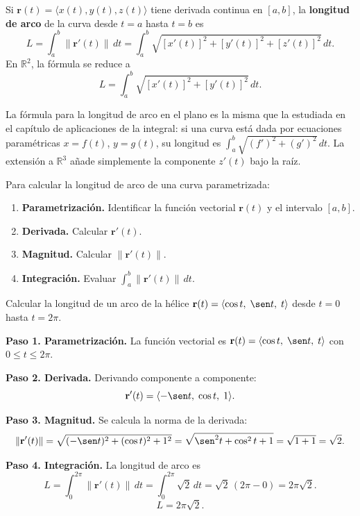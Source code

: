 \begin{theorem}
Si $\mathbf{r}(t) = \langle x(t), y(t), z(t) \rangle$ tiene derivada
continua en $[a,b]$, la \textbf{longitud de arco} de la curva desde
$t=a$ hasta $t=b$ es
\[
L = \int_a^b \|\mathbf{r}'(t)\|\,dt
  = \int_a^b \sqrt{[x'(t)]^2 + [y'(t)]^2 + [z'(t)]^2}\,dt.
\]
En $\mathbb{R}^2$, la fórmula se reduce a
\[
L = \int_a^b \sqrt{[x'(t)]^2 + [y'(t)]^2}\,dt.
\]
\end{theorem}

\begin{rem}
La fórmula para la longitud de arco en el plano es la misma que la
estudiada en el capítulo de aplicaciones de la integral: si una curva
está dada por ecuaciones paramétricas $x = f(t)$, $y = g(t)$, su
longitud es $\int_a^b \sqrt{(f')^2 + (g')^2}\,dt$. La extensión a
$\mathbb{R}^3$ añade simplemente la componente $z'(t)$ bajo la raíz.
\end{rem}

\begin{pasos}
Para calcular la longitud de arco de una curva parametrizada:
\begin{enumerate}
  \item \textbf{Parametrización.} Identificar la función vectorial
        $\mathbf{r}(t)$ y el intervalo $[a,b]$.
  \item \textbf{Derivada.} Calcular $\mathbf{r}'(t)$.
  \item \textbf{Magnitud.} Calcular $\|\mathbf{r}'(t)\|$.
  \item \textbf{Integración.} Evaluar $\displaystyle \int_a^b \|\mathbf{r}'(t)\|\,dt$.
\end{enumerate}
\end{pasos}

\begin{example}
Calcular la longitud de un arco de la hélice
$\mathbf{r}(t) = \langle \cos t,\; \sen t,\; t \rangle$ desde
$t=0$ hasta $t=2\pi$.
\begin{myproof}
\textbf{Paso 1. Parametrización.}
La función vectorial es $\mathbf{r}(t) = \langle \cos t,\; \sen t,\; t \rangle$
con $0 \leq t \leq 2\pi$.

\textbf{Paso 2. Derivada.}
Derivando componente a componente:
\[
\mathbf{r}'(t) = \langle -\sen t,\; \cos t,\; 1 \rangle.
\]

\textbf{Paso 3. Magnitud.}
Se calcula la norma de la derivada:
\[
\|\mathbf{r}'(t)\|
= \sqrt{(-\sen t)^2 + (\cos t)^2 + 1^2}
= \sqrt{\sen^2 t + \cos^2 t + 1}
= \sqrt{1+1} = \sqrt{2}.
\]

\textbf{Paso 4. Integración.}
La longitud de arco es
\[
L = \int_0^{2\pi} \|\mathbf{r}'(t)\|\,dt
  = \int_0^{2\pi} \sqrt{2}\,dt
  = \sqrt{2}\,(2\pi - 0)
  = 2\pi\sqrt{2}.
\]
\[
\boxed{L = 2\pi\sqrt{2}}.
\]
\end{myproof}
\end{example}

